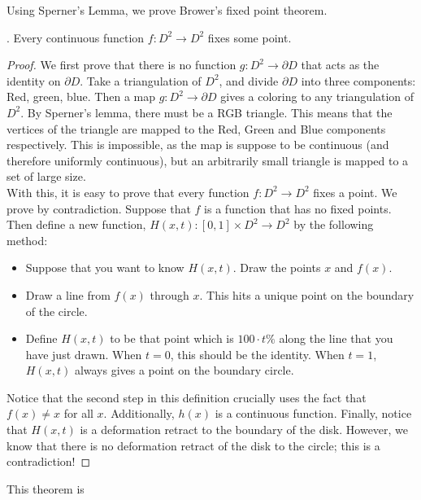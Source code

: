 Using Sperner's Lemma, we prove Brower's fixed point theorem. 
\begin{theorem}.
Every continuous function $f: D^2\to D^2$ fixes some point. 
\end{theorem}
\begin{proof}
We first prove that there is no function $g: D^2\to \partial D$ that acts as the identity on $\partial D$. Take a triangulation of $D^2$, and divide $\partial D$ into three components: Red, green, blue. Then a map $g:D^2\to \partial D$ gives a coloring to any triangulation of $D^2$. By Sperner's lemma, there must be a RGB triangle. This means that the vertices of the triangle are mapped to the Red, Green and Blue components respectively. This is impossible, as  the map is suppose to be continuous (and therefore uniformly continuous), but an arbitrarily small triangle is mapped to a set of large size.\\
With this, it is easy to prove that every function $f: D^2\to D^2$ fixes a point. We prove by contradiction. Suppose that $f$ is a function that has no fixed points. Then define a new function,  $H(x,  t): [0, 1]\times D^2\to D^2$ by the following method:
	\begin{itemize}
		\item Suppose that you want to know $H(x,  t)$. Draw the points $x$ and $f(x)$.
		\item Draw a line from $f(x)$ through $x$. This hits a unique point on the boundary of the circle.
		\item Define $H(x, t)$ to be that point which is $100\cdot t\%$ along the line that you have just drawn. 	When $t=0$,  this should be the identity. When $t=1$,  $H(x,  t)$ always gives a point on the boundary circle. 
	\end{itemize}
	Notice that the second step in this definition crucially uses the fact that $f(x)\neq x$ for all $x$. Additionally,  $h(x)$ is a continuous function. Finally,  notice that $H(x, t)$ is a deformation retract to the boundary of the disk. However,  we know that there is no deformation retract of the disk to the circle; this is a contradiction! 
\end{proof}

This theorem is 


